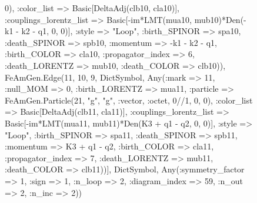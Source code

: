 \documentclass{revtex4}
\begin{document}
\begin{figure}[!htb]
\begin{center}
{0), :color_list => Basic[DeltaAdj(clb10, cla10)], :couplings_lorentz_list => Basic[-im*LMT(mua10, mub10)*Den(-k1 - k2 - q1, 0, 0)], :style => "Loop", :birth_SPINOR => spa10, :death_SPINOR => spb10, :momentum => -k1 - k2 - q1, :birth_COLOR => cla10, :propagator_index => 6, :death_LORENTZ => mub10, :death_COLOR => clb10)), FeAmGen.Edge(11, 10, 9, Dict{Symbol, Any}(:mark => 11, :null_MOM => 0, :birth_LORENTZ => mua11, :particle => FeAmGen.Particle(21, "g", "g", :vector, :octet, 0//1, 0, 0), :color_list => Basic[DeltaAdj(clb11, cla11)], :couplings_lorentz_list => Basic[-im*LMT(mua11, mub11)*Den(K3 + q1 - q2, 0, 0)], :style => "Loop", :birth_SPINOR => spa11, :death_SPINOR => spb11, :momentum => K3 + q1 - q2, :birth_COLOR => cla11, :propagator_index => 7, :death_LORENTZ => mub11, :death_COLOR => clb11))], Dict{Symbol, Any}(:symmetry_factor => 1, :sign => 1, :n_loop => 2, :diagram_index => 59, :n_out => 2, :n_inc => 2)) 
}
\end{center}
\end{figure}
\end{document}
